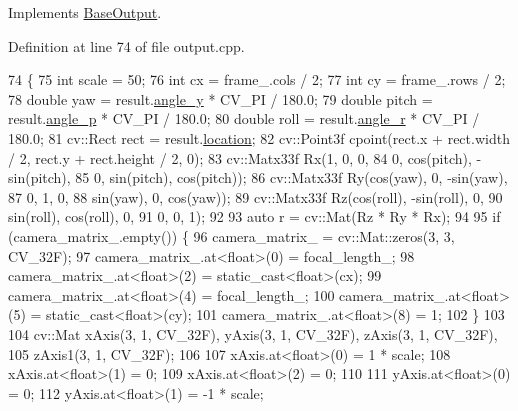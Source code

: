 Implements \hyperlink{classBaseOutput_a3549ade1424963fff201fd946075fd4e}{Base\+Output}.



Definition at line 74 of file output.\+cpp.


\begin{DoxyCode}
74                                                                          \{
75   \textcolor{keywordtype}{int} scale  = 50;
76   \textcolor{keywordtype}{int} cx = frame\_.cols / 2;
77   \textcolor{keywordtype}{int} cy = frame\_.rows / 2;
78   \textcolor{keywordtype}{double} yaw = result.\hyperlink{structInferenceResult_1_1HeadPoseResult_a6f9491752ad71d474f7b52f626bc6989}{angle\_y} * CV\_PI / 180.0;
79   \textcolor{keywordtype}{double} pitch = result.\hyperlink{structInferenceResult_1_1HeadPoseResult_aa5451224989c6d65741ff3a90e4c73a7}{angle\_p} * CV\_PI / 180.0;
80   \textcolor{keywordtype}{double} roll = result.\hyperlink{structInferenceResult_1_1HeadPoseResult_a34e1aa51cf21ddc17d874260f174c75e}{angle\_r} * CV\_PI / 180.0;
81   cv::Rect rect = result.\hyperlink{structInferenceResult_1_1Result_a20260cebf785b75132140ab517594660}{location};
82   cv::Point3f cpoint(rect.x + rect.width / 2, rect.y + rect.height / 2, 0);
83   cv::Matx33f Rx(1, 0, 0,
84                  0, cos(pitch), -sin(pitch),
85                  0, sin(pitch), cos(pitch));
86   cv::Matx33f Ry(cos(yaw), 0, -sin(yaw),
87                  0, 1, 0,
88                  sin(yaw), 0, cos(yaw));
89   cv::Matx33f Rz(cos(roll), -sin(roll), 0,
90                  sin(roll), cos(roll), 0,
91                  0, 0, 1);
92 
93   \textcolor{keyword}{auto} r = cv::Mat(Rz * Ry * Rx);
94 
95   \textcolor{keywordflow}{if} (camera\_matrix\_.empty()) \{
96     camera\_matrix\_ = cv::Mat::zeros(3, 3, CV\_32F);
97     camera\_matrix\_.at<\textcolor{keywordtype}{float}>(0) = focal\_length\_;
98     camera\_matrix\_.at<\textcolor{keywordtype}{float}>(2) = static\_cast<float>(cx);
99     camera\_matrix\_.at<\textcolor{keywordtype}{float}>(4) = focal\_length\_;
100     camera\_matrix\_.at<\textcolor{keywordtype}{float}>(5) = static\_cast<float>(cy);
101     camera\_matrix\_.at<\textcolor{keywordtype}{float}>(8) = 1;
102   \}
103 
104   cv::Mat xAxis(3, 1, CV\_32F), yAxis(3, 1, CV\_32F), zAxis(3, 1, CV\_32F),
105       zAxis1(3, 1, CV\_32F);
106 
107   xAxis.at<\textcolor{keywordtype}{float}>(0) = 1 * scale;
108   xAxis.at<\textcolor{keywordtype}{float}>(1) = 0;
109   xAxis.at<\textcolor{keywordtype}{float}>(2) = 0;
110 
111   yAxis.at<\textcolor{keywordtype}{float}>(0) = 0;
112   yAxis.at<\textcolor{keywordtype}{float}>(1) = -1 * scale;

\end{DoxyCode}
